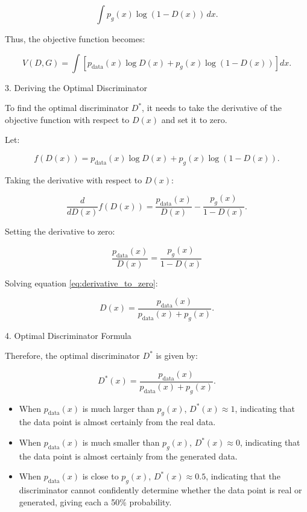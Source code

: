 \begin{equation}
    \int p_g(x) \log (1 - D(x)) \, dx.
\end{equation}

Thus, the objective function becomes:

\begin{equation}
    V(D, G) = \int \left[ p_{\text{data}}(x) \log D(x) + p_g(x) \log (1 - D(x)) \right] dx.
\end{equation}

3. Deriving the Optimal Discriminator

To find the optimal discriminator \( D^* \), it needs to take the derivative of the objective function with respect to \( D(x) \) and set it to zero.

Let:

\begin{equation}
    f(D(x)) = p_{\text{data}}(x) \log D(x) + p_g(x) \log (1 - D(x)).
\end{equation}

Taking the derivative with respect to \( D(x) \):

\begin{equation}
    \frac{d}{dD(x)} f(D(x)) = \frac{p_{\text{data}}(x)}{D(x)} - \frac{p_g(x)}{1 - D(x)}.
\end{equation}

Setting the derivative to zero:

\begin{equation}
    \frac{p_{\text{data}}(x)}{D(x)} = \frac{p_g(x)}{1 - D(x)}
    \label{eq:derivative_to_zero}
\end{equation}

Solving equation \eqref{eq:derivative_to_zero}:

\begin{equation}
    D(x) = \frac{p_{\text{data}}(x)}{p_{\text{data}}(x) + p_g(x)}.
\end{equation}

4. Optimal Discriminator Formula

Therefore, the optimal discriminator \( D^* \) is given by:

\begin{equation}
    D^*(x) = \frac{p_{\text{data}}(x)}{p_{\text{data}}(x) + p_g(x)}.
\end{equation}


\begin{itemize}
    \item When $p_{\text{data}}(x)$ is much larger than $p_g(x)$, $D^*(x) \approx 1$, indicating that the data point is almost certainly from the real data.
    
    \item When $p_{\text{data}}(x)$ is much smaller than $p_g(x)$, $D^*(x) \approx 0$, indicating that the data point is almost certainly from the generated data.
    
    \item When $p_{\text{data}}(x)$ is close to $p_g(x)$, $D^*(x) \approx 0.5$, indicating that the discriminator cannot confidently determine whether the data point is real or generated, giving each a 50\% probability.
\end{itemize}

